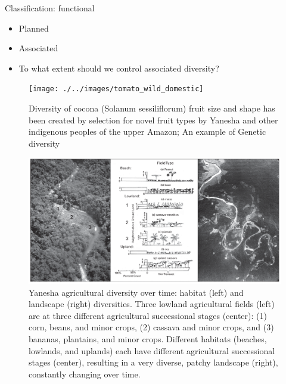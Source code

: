 \documentclass[
  ignorenonframetext,
  aspectratio=169]{beamer}
\providecommand{\tightlist}{%
  \setlength{\itemsep}{0pt}\setlength{\parskip}{0pt}}
\begin{document}
\begin{frame}{Classification: functional}
\protect\hypertarget{classification-functional}{}
\begin{itemize}
\tightlist
\item
  Planned
\item
  Associated
\end{itemize}

\begin{itemize}[<+->]
\tightlist
\item
  \alert{To what extent should we control associated diversity?}
\end{itemize}

\begin{figure}
\texttt{[image: ./../images/tomato\_wild\_domestic]} \caption{Diversity of cocona (Solanum sessiliflorum) fruit size and shape has been created by selection for novel fruit types by Yanesha and other indigenous peoples of the upper Amazon; An example of Genetic diversity}\label{fig:tomato-diversity}
\end{figure}
\end{frame}

\begin{frame}{}
\protect\hypertarget{section-13}{}
\begin{figure}
\includegraphics[width=0.7\linewidth]{./../images/yanesha_habitat_landscape_diversity} \caption{Yanesha agricultural diversity over time: habitat (left) and landscape (right) diversities. Three lowland agricultural fields (left) are at three different agricultural successional stages (center): (1) corn, beans, and minor crops, (2) cassava and minor crops, and (3) bananas, plantains, and minor crops. Different habitats (beaches, lowlands, and uplands) each have different agricultural successional stages (center), resulting in a very diverse, patchy landscape (right), constantly changing over time.}\label{fig:habitat-landscape}
\end{figure}
\end{frame}
\end{document}
